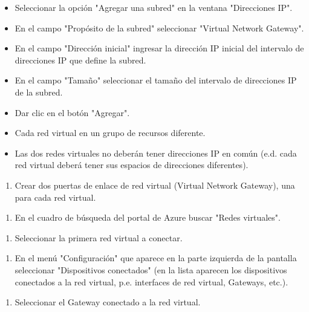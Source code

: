 \begin{itemize}
\item Seleccionar la opción "Agregar una subred" en la ventana "Direcciones IP".
\item En el campo "Propósito de la subred" seleccionar "Virtual Network Gateway".
\item En el campo "Dirección inicial" ingresar la dirección IP inicial del intervalo de direcciones IP que define la subred.
\item En el campo "Tamaño" seleccionar el tamaño del intervalo de direcciones IP de la subred.
\item Dar clic en el botón "Agregar".
\end{itemize}

\begin{itemize}
\item Cada red virtual en un grupo de recursos diferente.
\item Las dos redes virtuales no deberán tener direcciones IP en común (e.d. cada red virtual deberá tener sus espacios de direcciones diferentes).
\end{itemize}

\begin{enumerate}
\item Crear dos puertas de enlace de red virtual (Virtual Network Gateway), una para cada red virtual.
\end{enumerate}

\begin{enumerate}
\item En el cuadro de búsqueda del portal de Azure buscar "Redes virtuales".
\end{enumerate}

\begin{enumerate}
\item Seleccionar la primera red virtual a conectar.
\end{enumerate}

\begin{enumerate}
\item En el menú "Configuración" que aparece en la parte izquierda de la pantalla seleccionar "Dispositivos conectados" (en la lista aparecen los dispositivos conectados a la red virtual, p.e. interfaces de red virtual, Gateways, etc.).
\end{enumerate}

\begin{enumerate}
\item Seleccionar el Gateway conectado a la red virtual.
\end{enumerate}

